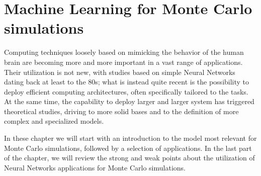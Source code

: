 \chapter{Machine Learning for Monte Carlo simulations}
Computing techniques loosely based on mimicking the behavior of the human brain are becoming more and more important in a vast range of applications.
Their utilization is not new, with studies based on simple Neural Networks~\cite{nn1,nn2,nn3} dating back at least to the 80s; what is instead quite recent is the possibility to deploy efficient computing architectures, often specifically tailored to the tasks.
At the same time, the capability to deploy larger and larger system has triggered theoretical studies, driving to more solid bases and to  the definition of more complex and specialized models.

In these chapter we will start with an introduction to the model most relevant for Monte Carlo simulations, followed by a selection of applications. In the last part of the chapter, we will review the strong and weak points about the utilization of Neural Networks applications for Monte Carlo simulations.
